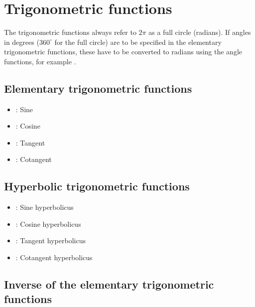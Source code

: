 \chapter{Trigonometric functions}\label{sec:Winkelfunktionen}

The trigonometric functions always refer to $2\pi$ as a full circle (radians).
If angles in degrees ($360^\circ$ for the full circle) are to be specified
in the elementary trigonometric functions,
these have to be converted to radians using the angle functions, for example
.



\section{Elementary trigonometric functions}

\begin{itemize}

\item
{}:
Sine

\item
{}:
Cosine

\item
{}:
Tangent

\item
{}:
Cotangent

\end{itemize}



\section{Hyperbolic trigonometric functions}

\begin{itemize}

\item
{}:
Sine hyperbolicus

\item
{}:
Cosine hyperbolicus

\item
{}:
Tangent hyperbolicus

\item
{}:
Cotangent hyperbolicus

\end{itemize}



\section{Inverse of the elementary trigonometric functions}

